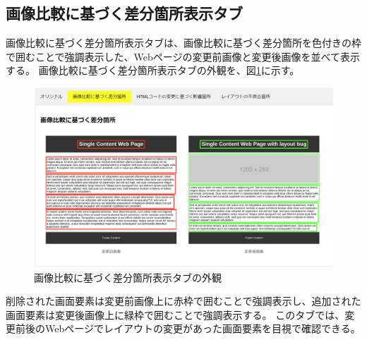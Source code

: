 \subsection{画像比較に基づく差分箇所表示タブ}\label{subsec:images_tab}
画像比較に基づく差分箇所表示タブは、画像比較に基づく差分箇所を色付きの枠で囲むことで強調表示した、Webページの変更前画像と変更後画像を並べて表示する。
画像比較に基づく差分箇所表示タブの外観を、図\ref{fig: Appearance_images_tab}に示す。
\begin{figure}[tp]
    \begin{center}
        \includegraphics[width=1.0\columnwidth]{image/3_images_tab2.png}
        \caption{画像比較に基づく差分箇所表示タブの外観}
        \label{fig: Appearance_images_tab}
    \end{center}
\end{figure}
削除された画面要素は変更前画像上に赤枠で囲むことで強調表示し、追加された画面要素は変更後画像上に緑枠で囲むことで強調表示する。
このタブでは、変更前後のWebページでレイアウトの変更があった画面要素を目視で確認できる。

